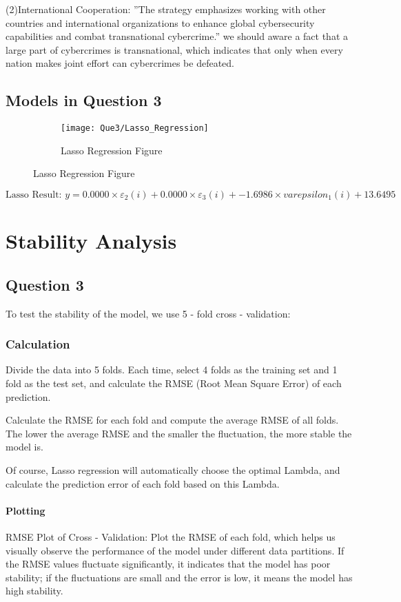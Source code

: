 \documentclass[12pt]{article}
\begin{document}
		(2)International Cooperation: ”The strategy emphasizes working with other countries and international organizations to enhance global cybersecurity capabilities and combat transnational cybercrime.” we should aware a fact that a large part of cybercrimes is transnational, which indicates that only when every nation makes joint effort can cybercrimes be defeated.
		
		\subsection{Models in Question 3}
				\begin{figure}[H]
			
			\centering
			\begin{subfigure}
				\centering
				\texttt{[image: Que3/Lasso\_Regression]}
				\caption{Lasso Regression Figure}
				\label{fig:LassoRegression}
			\end{subfigure}
			
		\end{figure}
		\[\text{Lasso Result: }y = 0.0000\times \varepsilon_2(i) + 0.0000 \times \varepsilon_3(i) + -1.6986 \times varepsilon_1(i) + 13.6495\]
	\section{Stability Analysis}
	\subsection{Question 3}
	To test the stability of the model, we use 5 - fold cross - validation:
	\subsubsection{Calculation}
	Divide the data into 5 folds. Each time, select 4 folds as the training set and 1 fold as the test set, and calculate the RMSE (Root Mean Square Error) of each prediction.
	
	Calculate the RMSE for each fold and compute the average RMSE of all folds. The lower the average RMSE and the smaller the fluctuation, the more stable the model is.
	
	Of course, Lasso regression will automatically choose the optimal Lambda, and calculate the prediction error of each fold based on this Lambda.
	
	
	\paragraph{Plotting}
	RMSE Plot of Cross - Validation:
	Plot the RMSE of each fold, which helps us visually observe the performance of the model under different data partitions. If the RMSE values fluctuate significantly, it indicates that the model has poor stability; if the fluctuations are small and the error is low, it means the model has high stability.
	
\end{document}
